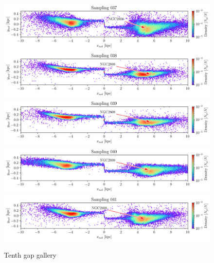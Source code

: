 \documentclass{aa}
\begin{document}
\begin{appendix}
    \begin{figure}
      \centering
      \includegraphics[width=\linewidth]{gallery_of_gaps_monte-carlo-037.png}
      \includegraphics[width=\linewidth]{gallery_of_gaps_monte-carlo-038.png}
      \includegraphics[width=\linewidth]{gallery_of_gaps_monte-carlo-039.png}
      \includegraphics[width=\linewidth]{gallery_of_gaps_monte-carlo-040.png}
      \includegraphics[width=\linewidth]{gallery_of_gaps_monte-carlo-041.png}      
      \caption{Tenth gap gallery}
      \label{fig:gallery9}
    \end{figure}        
    

\end{appendix}
\end{document}
